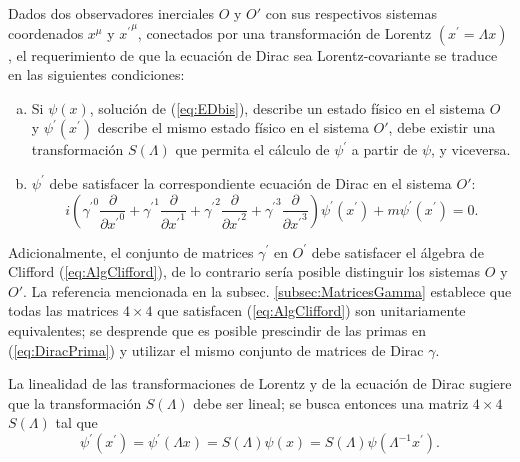 Dados dos observadores inerciales $O$ y $O'$ con sus respectivos sistemas coordenados $x^\mu$ y ${x^\prime}^\mu$, conectados por una transformación de Lorentz $(x^\prime=\Lambda x)$, el requerimiento de que la ecuación de Dirac sea Lorentz-covariante se traduce en las siguientes condiciones:
\begin{enumerate}[(a)]
	\item Si $\psi(x)$, solución de (\ref{eq:EDbis}), describe un estado físico en el sistema $O$ y $\psi^{\prime}(x^{\prime})$ describe el mismo estado físico en el sistema $O'$, debe existir una transformación $S(\Lambda)$ que permita el cálculo de $\psi^{\prime}$ a partir de $\psi$, y viceversa.
\item $\psi^{\prime}$ debe satisfacer la correspondiente ecuación de Dirac en el sistema $O'$:
	\begin{equation}\label{eq:DiracPrima}
	i\left({\gamma^{\prime}}^0 \frac{\partial}{\partial {x^{\prime}}^0}+{\gamma^{\prime}}^1 \frac{\partial}{\partial {x^{\prime}}^1}+{\gamma^{\prime}}^2 \frac{\partial}{\partial {x^{\prime}}^2}+{\gamma^{\prime}}^3 						\frac{\partial}{\partial {x^{\prime}}^3} \right)\psi^{\prime}(x^{\prime}) + m\psi^{\prime}(x^{\prime})=0.
\end{equation}
\end{enumerate}
Adicionalmente, el conjunto de matrices $\gamma^{\prime}$ en $O^\prime$ debe satisfacer el álgebra de Clifford (\ref{eq:AlgClifford}), de lo contrario sería posible distinguir los sistemas $O$ y $O'$. La referencia \citep{Good} mencionada en la subsec. \ref{subsec:MatricesGamma} establece que todas las matrices $4\times 4$ que satisfacen (\ref{eq:AlgClifford}) son unitariamente equivalentes; se desprende que es posible prescindir de las primas en (\ref{eq:DiracPrima}) y utilizar el mismo conjunto de matrices de Dirac $\gamma$.

La linealidad de las transformaciones de Lorentz y de la ecuación de Dirac sugiere que la transformación $S(\Lambda)$ debe ser lineal; se busca entonces una matriz $4\times 4$ $S(\Lambda)$ tal que
\begin{equation}\label{eq:TransfS}
\psi^{\prime}(x^{\prime})=\psi^{\prime}(\Lambda x)=S(\Lambda)\psi(x)=S(\Lambda)\psi(\Lambda^{-1}x^{\prime}).
\end{equation}

